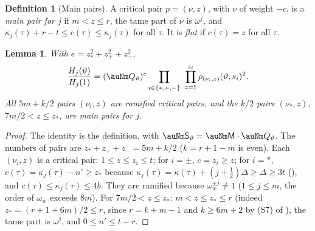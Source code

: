 \documentclass[10pt]{amsart}
\newtheorem{lemma}[theorem]{Lemma}
\theoremstyle{definition}
\newtheorem{definition}[theorem]{Definition}
\theoremstyle{remark}
\begin{document}
\begin{definition}[Main pairs]\label{po:main}
A critical pair $p=(\nu,z)$, with $\nu$ of weight $-c$, is a \emph{main pair for $j$} if
$m<z\le r$, the tame part of $\nu$ is $\omega^j$, and $\kappa_j(\tau)+r-t\le c(\tau)\le
\kappa_j(\tau)$ for all $\tau$. It is \emph{flat} if $c(\tau)=z$ for all $\tau$.
\end{definition}

\begin{lemma}\label{po:Hratio}
With $e=z_\ast^2+z_+^2+z_-^2$,
\[
\frac{H_j(\vartheta)}{H_j(1)}=(\auNm Q_\vartheta)^{e}\prod_{i\in\{\ast,+,-\}}\ \prod_{z=1}^{z_i}
\rho_{(\nu_i,z)}(\vartheta,s_i)^2 .
\]
All $5m+k/2$ pairs $(\nu_i,z)$ are ramified critical pairs, and the $k/2$ pairs $(\nu_\ast,z)$,
$7m/2<z\le z_\ast$, are main pairs for $j$.
\end{lemma}
\begin{proof}
The identity is the definition, with $\auNm\mathsf S_\vartheta=\auNm\mathsf M\cdot\auNm
Q_\vartheta$. The numbers of pairs are $z_\ast+z_++z_-=5m+k/2$ ($k=r+1-m$ is even). Each
$(\nu_i,z)$ is a critical pair: $1\le z\le z_i\le t$; for $i=\pm$, $c=z_i\ge z$; for $i=\ast$,
$c(\tau)=\kappa_j(\tau)-n'\ge z_\ast$ because $\kappa_j(\tau)=\kappa(\tau)+(j+\frac12)\Delta\ge\Delta\ge3t$ ({\cite[\S14.1]{P46}}), and $c(\tau)\le
\kappa_j(\tau)\le4b$. They are ramified because $\omega_w^{\pm j}\ne1$ ($1\le j\le m$, the order
of $\omega_w$ exceeds $8m$). For $7m/2<z\le z_\ast$: $m<z\le z_\ast\le r$ (indeed $z_\ast=(r+1+6m)/2\le r$, since $r=k+m-1$ and
$k\ge6m+2$ by (S7) of {\cite[Lemma~13.4]{P46}}), the tame part is
$\omega^j$, and $0\le n'\le t-r$.
\end{proof}
\end{document}
